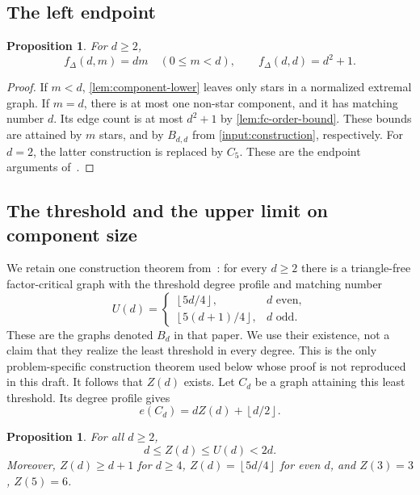 \documentclass[11pt]{article}
\newtheorem{proposition}[theorem]{Proposition}
\theoremstyle{definition}
\theoremstyle{remark}
\newcommand{\fDelta}{f_{\Delta}}
\newcommand{\floor}[1]{\left\lfloor #1\right\rfloor}
\begin{document}
\subsection{The left endpoint}

\begin{proposition}\label{input:left}
For $d\ge2$,
\[
  \fDelta(d,m)=dm\quad(0\le m<d),\qquad
  \fDelta(d,d)=d^2+1.
\]
\end{proposition}

\begin{proof}
If $m<d$, \cref{lem:component-lower} leaves only stars in a normalized
extremal graph. If $m=d$, there is at most one non-star component, and it
has matching number $d$. Its edge count is at most $d^2+1$ by
\cref{lem:fc-order-bound}. These bounds are attained by $m$ stars, and by
$B_{d,d}$ from \cref{input:construction}, respectively. For $d=2$, the latter
construction is replaced by $C_5$. These are the endpoint arguments
of~\cite[Theorems~3.3, 3.4]{AEY2022}.
\end{proof}

\subsection{The threshold and the upper limit on component size}

We retain one construction theorem from~\cite[Proposition~4.3]{AEY2022}:
for every $d\ge2$ there is a triangle-free factor-critical graph with the
threshold degree profile and matching number
\[
  U(d)=
  \begin{cases}
    \floor{5d/4},&d\text{ even},\\
    \floor{5(d+1)/4},&d\text{ odd}.
  \end{cases}
\]
These are the graphs denoted $B_d$ in that paper. We use their existence,
not a claim that they realize the least threshold in every degree.
This is the only problem-specific construction theorem used below whose
proof is not reproduced in this draft.
It follows that $Z(d)$ exists. Let $C_d$ be a graph attaining this least
threshold. Its degree profile gives
\[
  e(C_d)=dZ(d)+\floor{d/2}.
\]

\begin{proposition}\label{input:Z}
For all $d\ge2$,
\[
  d\le Z(d)\le U(d)<2d.
\]
Moreover, $Z(d)\ge d+1$ for $d\ge4$, $Z(d)=\floor{5d/4}$ for even $d$,
and $Z(3)=3$, $Z(5)=6$.
\end{proposition}
\end{document}
